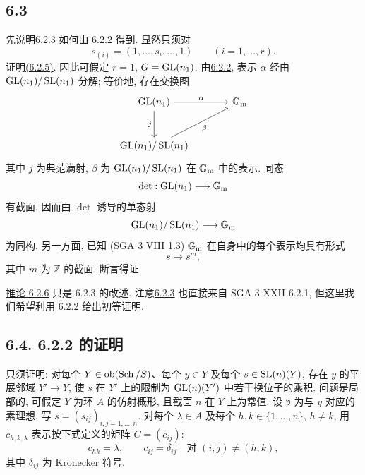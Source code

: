 \subsection*{6.3} 先说明\hyperlink{sga6.e10.cor.6-2-3}{6.2.3} 如何由 6.2.2 得到. 显然只须对
%
%
\[
s_{(i)}=(1,\ldots,s_i,\ldots,1)\qquad(i=1,\ldots,r).
\]
证明\hyperlink{sga6.e10.eq.6-2-5}{(6.2.5)}. 因此可假定 $r=1$, $G=\operatorname{GL}(n_1)$. 由\hyperlink{sga6.e10.prop.6-2-2}{6.2.2}, 表示 $\alpha$ 经由 $\operatorname{GL}(n_1)/\operatorname{SL}(n_1)$ 分解; 等价地, 存在交换图
%
%
\[
\begin{tikzcd}[column sep=large,row sep=large]
\GL(n_1) \arrow[r,"\alpha"] \arrow[d,"j"'] & \Gm\\
\GL(n_1)/\SL(n_1) \arrow[ur,"\beta"'] &
\end{tikzcd}
\]
其中 $j$ 为典范满射, $\beta$ 为 $\operatorname{GL}(n_1)/\operatorname{SL}(n_1)$ 在 $\mathbb G_{\mathrm m}$ 中的表示. 同态
%
\[
\det:\operatorname{GL}(n_1)\longrightarrow\mathbb G_{\mathrm m}
\]
有截面. 因而由 $\det$ 诱导的单态射
\[
\operatorname{GL}(n_1)/\operatorname{SL}(n_1)\longrightarrow\mathbb G_{\mathrm m}
\]
为同构. 另一方面, 已知 (SGA 3 VIII 1.3) $\mathbb G_{\mathrm m}$ 在自身中的每个表示均具有形式
%
%
\[
s\longmapsto s^m,
\]
其中 $m$ 为 $\mathbb Z$ 的截面. 断言得证.

\hyperlink{sga6.e10.cor.6-2-6}{推论 6.2.6} 只是 6.2.3 的改述. 注意\hyperlink{sga6.e10.cor.6-2-3}{6.2.3} 也直接来自 SGA 3 XXII 6.2.1, 但这里我们希望利用 6.2.2 给出初等证明.
%
%

\subsection*{6.4. 6.2.2 的证明} 只须证明: 对每个 $Y\in\operatorname{ob}(\operatorname{Sch}/S)$、每个 $y\in Y$ 及每个 $s\in\operatorname{SL}(n)(Y)$, 存在 $y$ 的平展邻域 $Y'\to Y$, 使 $s$ 在 $Y'$ 上的限制为 $\operatorname{GL}(n)(Y')$ 中若干换位子的乘积. 问题是局部的, 可假定 $Y$ 为环 $A$ 的仿射概形, 且截面 $n$ 在 $Y$ 上为常值. 设 $\mathfrak p$ 为与 $y$ 对应的素理想, 写 $s=(s_{ij})_{i,j=1,\ldots,n}$. 对每个 $\lambda\in A$ 及每个 $h,k\in\{1,\ldots,n\}$, $h\ne k$, 用 $c_{h,k,\lambda}$ 表示按下式定义的矩阵 $C=(c_{ij})$:
%
%
%
%
%
%
%
%
%
%
\[
c_{hk}=\lambda,\qquad
c_{ij}=\delta_{ij}\quad\text{对 }(i,j)\ne(h,k),
\]
其中 $\delta_{ij}$ 为 Kronecker 符号.

